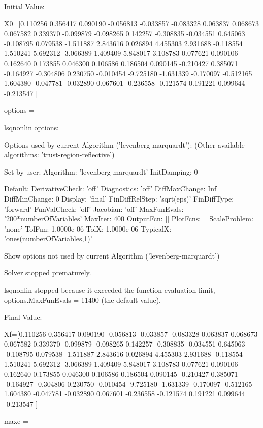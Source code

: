 \documentclass[12pt]{article}   %
\begin{document}
Initial Value:

	X0=[0.110256 0.356417 0.090190 -0.056813 -0.033857 -0.083328 0.063837 0.068673 0.067582 0.339370 -0.099879 -0.098265 0.142257 -0.308835 -0.034551 0.645063 -0.108795 0.079538 -1.511887 2.843616 0.026894 4.455303 2.931688 -0.118554 1.510241 5.692312 -3.066389 1.409409 5.848017 3.108783 0.077621 0.090106 0.162640 0.173855 0.046300 0.106586 0.186504 0.090145 -0.210427 0.385071 -0.164927 -0.304806 0.230750 -0.010454 -9.725180 -1.631339 -0.170097 -0.512165 1.604380 -0.047781 -0.032890 0.067601 -0.236558 -0.121574 0.191221 0.099644 -0.213547 ]

options = 

  lsqnonlin options:

   Options used by current Algorithm ('levenberg-marquardt'):
   (Other available algorithms: 'trust-region-reflective')

   Set by user:
          Algorithm: 'levenberg-marquardt'
        InitDamping: 0

   Default:
    DerivativeCheck: 'off'
        Diagnostics: 'off'
      DiffMaxChange: Inf
      DiffMinChange: 0
            Display: 'final'
     FinDiffRelStep: 'sqrt(eps)'
        FinDiffType: 'forward'
        FunValCheck: 'off'
           Jacobian: 'off'
        MaxFunEvals: '200*numberOfVariables'
            MaxIter: 400
          OutputFcn: []
           PlotFcns: []
       ScaleProblem: 'none'
             TolFun: 1.0000e-06
               TolX: 1.0000e-06
           TypicalX: 'ones(numberOfVariables,1)'

   Show options not used by current Algorithm ('levenberg-marquardt')


Solver stopped prematurely.

lsqnonlin stopped because it exceeded the function evaluation limit,
options.MaxFunEvals = 11400 (the default value).

Final Value:

	 Xf=[0.110256 0.356417 0.090190 -0.056813 -0.033857 -0.083328 0.063837 0.068673 0.067582 0.339370 -0.099879 -0.098265 0.142257 -0.308835 -0.034551 0.645063 -0.108795 0.079538 -1.511887 2.843616 0.026894 4.455303 2.931688 -0.118554 1.510241 5.692312 -3.066389 1.409409 5.848017 3.108783 0.077621 0.090106 0.162640 0.173855 0.046300 0.106586 0.186504 0.090145 -0.210427 0.385071 -0.164927 -0.304806 0.230750 -0.010454 -9.725180 -1.631339 -0.170097 -0.512165 1.604380 -0.047781 -0.032890 0.067601 -0.236558 -0.121574 0.191221 0.099644 -0.213547 ]

maxe =
\end{document}
